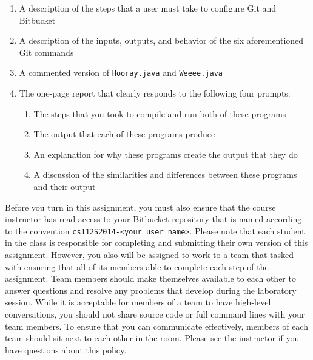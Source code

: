   \vspace*{-.05in}
  \begin{enumerate}
	
    \item A description of the steps that a user must take to configure Git and Bitbucket

    \item A description of the inputs, outputs, and behavior of the six aforementioned Git commands

    \item A commented version of {\tt Hooray.java} and {\tt Weeee.java}
	
    \item The one-page report that clearly responds to the following four prompts:
  
      \vspace*{-.05in}
      \begin{enumerate}

	\item The steps that you took to compile and run both of these programs

	\item The output that each of these programs produce

	\item An explanation for why these programs create the output that they do

	\item A discussion of the similarities and differences between these programs and their output

      \end{enumerate}


  \end{enumerate}

Before you turn in this assignment, you must also ensure that the course instructor has read access to your Bitbucket
repository that is named according to the convention {\tt cs112S2014-<your user name>}. Please note that each student in
the class is responsible for completing and submitting their own version of this assignment.  However, you also will be
assigned to work to a team that tasked with ensuring that all of its members  able to complete each step of the
assignment.  Team members should make themselves available to each other to answer questions and resolve any problems
that develop during the laboratory session. While it is acceptable for members of a team to have high-level
conversations, you should not share source code or full command lines with your team members. To ensure that you can
communicate effectively, members of each team should sit next to each other in the room.  Please see the instructor if
you have questions about this policy.




